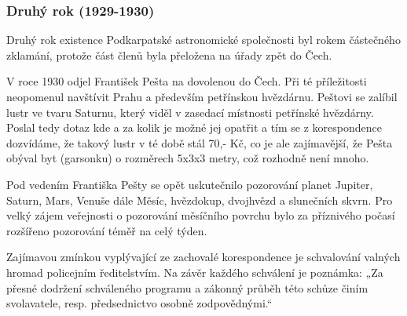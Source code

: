 \documentclass[10pt,a5paper,twoside]{book}
\begin{document}
\subsubsection*{Druhý rok (1929-1930)}
\par Druhý rok existence Podkarpatské astronomické společnosti byl rokem částečného zklamání, protože část členů byla přeložena na úřady zpět do Čech. 
\par V roce 1930 odjel František Pešta na dovolenou do Čech. Při té příležitosti neopomenul navštívit Prahu a především petřínskou hvězdárnu. Peštovi se zalíbil lustr ve tvaru Saturnu, který viděl v zasedací místnosti petřínské hvězdárny. Poslal tedy dotaz kde a za kolik je možné jej opatřit a tím se z korespondence dozvídáme, že takový lustr v té době stál 70,- Kč, co je ale zajímavější, že Pešta obýval byt (garsonku) o rozměrech 5x3x3 metry, což rozhodně není mnoho.
\par Pod vedením Františka Pešty se opět uskutečnilo pozorování planet Jupiter, Saturn, Mars, Venuše dále Měsíc, hvězdokup, dvojhvězd a slunečních skvrn. Pro velký zájem veřejnosti o pozorování měsíčního povrchu bylo za příznivého počasí rozšířeno pozorování téměř na celý týden.
\par Zajímavou zmínkou vyplývající ze zachovalé korespondence je schvalování valných hromad policejním ředitelstvím. Na závěr každého schválení je poznámka: „Za přesné dodržení schváleného programu a zákonný průběh této schůze činím svolavatele, resp. předsednictvo osobně zodpovědnými.“ 
\end{document}
